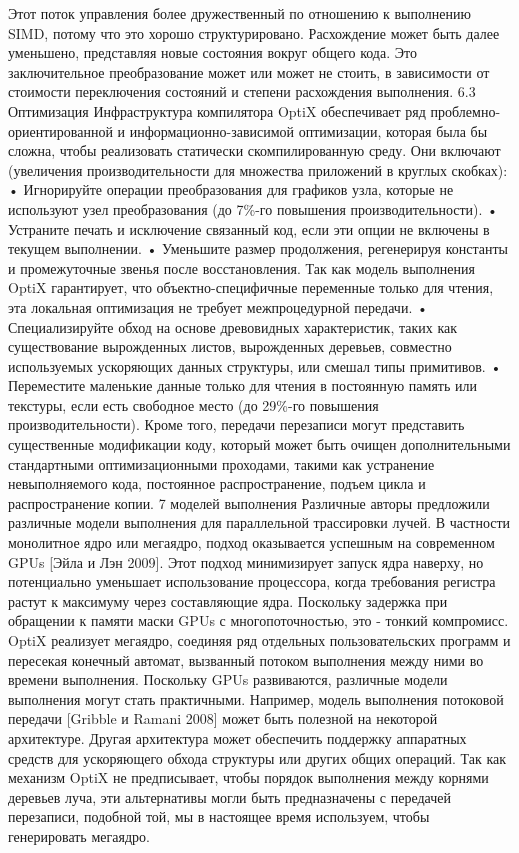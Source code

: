 Этот поток управления более дружественный по отношению к выполнению SIMD, потому что это хорошо структурировано. Расхождение может быть далее уменьшено, представляя новые состояния вокруг общего кода. Это заключительное преобразование может или может не стоить, в зависимости от стоимости переключения состояний и степени расхождения выполнения.
6.3 Оптимизация
Инфраструктура компилятора OptiX обеспечивает ряд проблемно-ориентированной и информационно-зависимой оптимизации, которая была бы сложна, чтобы реализовать статически скомпилированную среду. Они включают (увеличения производительности для множества приложений в круглых скобках):
• Игнорируйте операции преобразования для графиков узла, которые не используют узел преобразования (до 7\%-го повышения производительности).
• Устраните печать и исключение связанный код, если эти опции не включены в текущем выполнении.
• Уменьшите размер продолжения, регенерируя константы и промежуточные звенья после восстановления. Так как модель выполнения OptiX гарантирует, что объектно-специфичные переменные только для чтения, эта локальная оптимизация не требует межпроцедурной передачи.
• Специализируйте обход на основе древовидных характеристик, таких как существование вырожденных листов, вырожденных деревьев, совместно используемых ускоряющих данных структуры, или смешал типы примитивов.
• Переместите маленькие данные только для чтения в постоянную память или текстуры, если есть свободное место (до 29\%-го повышения производительности).
Кроме того, передачи перезаписи могут представить существенные модификации коду, который может быть очищен дополнительными стандартными оптимизационными проходами, такими как устранение невыполняемого кода, постоянное распространение, подъем цикла и распространение копии.
7 моделей выполнения
Различные авторы предложили различные модели выполнения для параллельной трассировки лучей. В частности монолитное ядро или мегаядро, подход оказывается успешным на современном GPUs [Эйла и Лэн 2009]. Этот подход минимизирует запуск ядра наверху, но потенциально уменьшает использование процессора, когда требования регистра растут к максимуму через составляющие ядра. Поскольку задержка при обращении к памяти маски GPUs с многопоточностью, это - тонкий компромисс.
OptiX реализует мегаядро, соединяя ряд отдельных пользовательских программ и пересекая конечный автомат, вызванный потоком выполнения между ними во времени выполнения. Поскольку GPUs развиваются, различные модели выполнения могут стать практичными. Например, модель выполнения потоковой передачи [Gribble и Ramani 2008] может быть полезной на некоторой архитектуре. Другая архитектура может обеспечить поддержку аппаратных средств для ускоряющего обхода структуры или других общих операций. Так как механизм OptiX не предписывает, чтобы порядок выполнения между корнями деревьев луча, эти альтернативы могли быть предназначены с передачей перезаписи, подобной той, мы в настоящее время используем, чтобы генерировать мегаядро.
